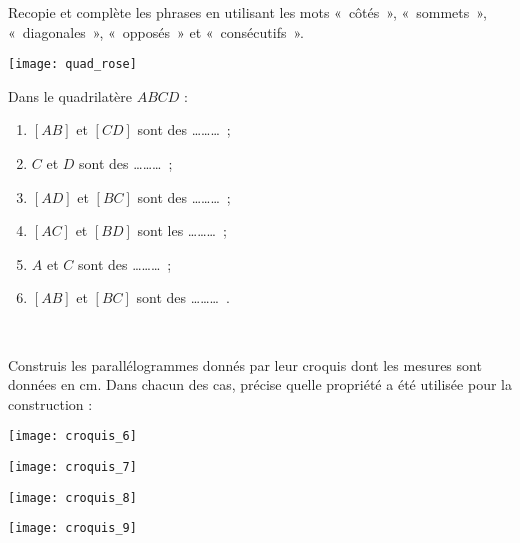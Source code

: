 

\begin{exercice}
Recopie et complète les phrases en utilisant les mots « côtés », « sommets », « diagonales », « opposés » et « consécutifs ».\\[-3em]
\begin{minipage}[c]{0.26\linewidth}
\vspace{2cm}
 \texttt{[image: quad\_rose]}
 \end{minipage} \hfill%
 \begin{minipage}[t]{0.66\linewidth}
 Dans le quadrilatère $ABCD$ :
 \begin{enumerate}
  \item $[AB]$ et $[CD]$ sont des \ldots \ldots \ldots ;
  \item $C$ et $D$ sont des \ldots \ldots \ldots ;
  \item $[AD]$ et $[BC]$ sont des \ldots \ldots \ldots ;
  \item $[AC]$ et $[BD]$ sont les \ldots \ldots \ldots ;
  \item $A$ et $C$ sont des \ldots \ldots \ldots ;
  \item $[AB]$ et $[BC]$ sont des \ldots \ldots \ldots .
  \end{enumerate}
 \end{minipage} \\
\end{exercice}


\begin{exercice}
Construis les parallélogrammes donnés par leur croquis dont les mesures sont données en cm. Dans chacun des cas, précise quelle propriété a été utilisée pour la construction :
\begin{colenumerate}{2}
 \item
 
 \texttt{[image: croquis\_6]}
  \item
 
 \texttt{[image: croquis\_7]}
  \item
 
 \texttt{[image: croquis\_8]}
  \item
 
 \texttt{[image: croquis\_9]}
 \end{colenumerate}
\end{exercice}


